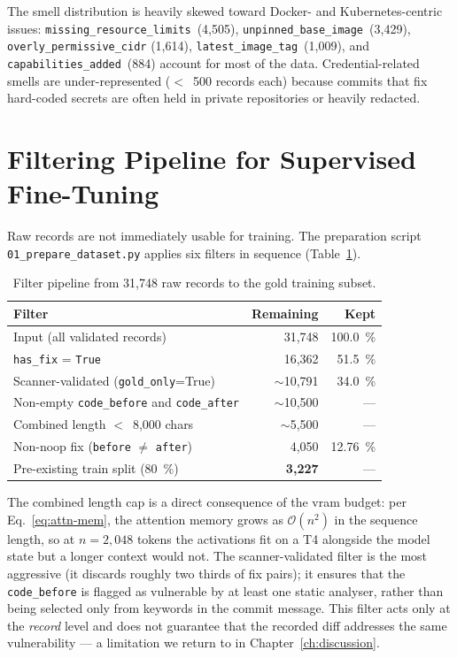 \documentclass[12pt, a4paper]{report}
\begin{document}
The smell distribution is heavily skewed toward Docker- and
Kubernetes-centric issues: \texttt{missing\_resource\_limits}~(4{,}505),
\texttt{unpinned\_base\_image}~(3{,}429), \texttt{overly\_permissive\_cidr}
(1{,}614), \texttt{latest\_image\_tag}~(1{,}009), and
\texttt{capabilities\_added}~(884) account for most of the data.
Credential-related smells are under-represented ($<$~500 records each)
because commits that fix hard-coded secrets are often held in private
repositories or heavily redacted.

\section{Filtering Pipeline for Supervised Fine-Tuning}
\label{sec:filter}

Raw records are not immediately usable for training. The preparation
script \texttt{01\_prepare\_dataset.py} applies six filters in sequence
(Table~\ref{tab:filter-pipeline}).

\begin{table}[H]
  \centering
  \caption{Filter pipeline from 31{,}748 raw records to the gold training subset.}
  \label{tab:filter-pipeline}
  \small
  \begin{tabular}{lrr}
    \toprule
    \textbf{Filter} & \textbf{Remaining} & \textbf{Kept} \\
    \midrule
    Input (all validated records)         & 31{,}748 & 100.0~\% \\
    \texttt{has\_fix} = \texttt{True}     & 16{,}362 & 51.5~\% \\
    Scanner-validated (\texttt{gold\_only}=True) & $\sim$10{,}791 & 34.0~\% \\
    Non-empty \texttt{code\_before} and \texttt{code\_after} & $\sim$10{,}500 & --- \\
    Combined length $<$~8{,}000 chars     & $\sim$5{,}500 & --- \\
    Non-noop fix (\texttt{before} $\neq$ \texttt{after}) & 4{,}050 & 12.76~\% \\
    Pre-existing train split (80~\%)      & \textbf{3{,}227} & --- \\
    \bottomrule
  \end{tabular}
\end{table}

The combined length cap is a direct consequence of the \gls{vram} budget:
per Eq.~\eqref{eq:attn-mem}, the attention memory grows as
\(\mathcal{O}(n^{2})\) in the sequence length, so at
\(n = 2{,}048\) tokens the activations fit on a T4 alongside the
model state but a longer context would not. The scanner-validated filter is the most aggressive (it
discards roughly two thirds of fix pairs); it ensures that the
\texttt{code\_before} is flagged as vulnerable by at least one static
analyser, rather than being selected only from keywords in the commit
message. This filter acts only at the \emph{record} level and does not
guarantee that the recorded diff addresses the same vulnerability --- a
limitation we return to in Chapter~\ref{ch:discussion}.
\end{document}
